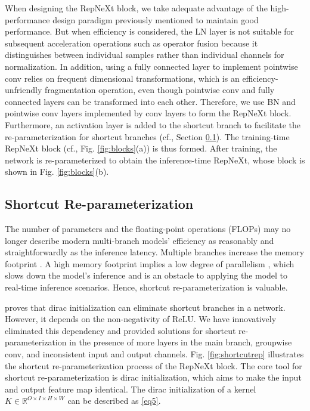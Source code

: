 \documentclass[preprint,12pt]{elsarticle}
\begin{document}
When designing the RepNeXt block, we take adequate advantage of the high-performance design paradigm previously mentioned to maintain good performance. 
But when efficiency is considered, the LN layer is not suitable for subsequent acceleration operations such as operator fusion because it distinguishes between individual samples rather than individual channels for normalization. In addition, using a fully connected layer to implement pointwise conv relies on frequent dimensional transformations, which is an efficiency-unfriendly fragmentation operation, even though pointwise conv and fully connected layers can be transformed into each other. Therefore, we use BN and pointwise conv layers implemented by conv layers to form the RepNeXt block. Furthermore, an activation layer is added to the shortcut branch to facilitate the re-parameterization for shortcut branches (cf., Section \ref{sec:3-2}). The training-time RepNeXt block (cf., Fig. \ref{fig:blocks}(a)) is thus formed. After training, the network is re-parameterized to obtain the inference-time RepNeXt, whose block is shown in Fig. \ref{fig:blocks}(b).


\subsection{Shortcut Re-parameterization}
\label{sec:3-2}

The number of parameters and the floating-point operations (FLOPs) may no longer describe modern multi-branch models' efficiency as reasonably and straightforwardly as the inference latency. Multiple branches increase the memory footprint \cite{repvgg}. A high memory footprint implies a low degree of parallelism \cite{mobilenetv3}, which slows down the model's inference and is an obstacle to applying the model to real-time inference scenarios. Hence, shortcut re-parameterization is valuable. 

\cite{rmnet} proves that dirac initialization can eliminate shortcut branches in a network. However, it depends on the non-negativity of ReLU. We have innovatively eliminated this dependency and provided solutions for shortcut re-parameterization in the presence of more layers in the main branch, groupwise conv, and inconsistent input and output channels. Fig. \ref{fig:shortcutrep} illustrates the shortcut re-parameterization process of the RepNeXt block. The core tool for shortcut re-parameterization is dirac initialization, which aims to make the input and output feature map identical. The dirac initialization of a kernel $K \in \mathbb{R}^{O \times I \times H \times W}$ can be described as \eqref{eq5}.
\end{document}

